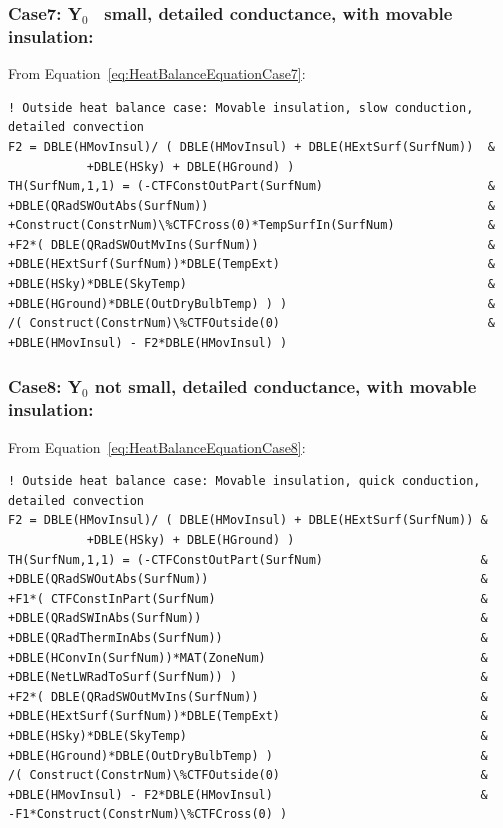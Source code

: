 \subsubsection{Case7: Y\(_{0}\)~ small, detailed conductance, with movable insulation:}\label{case7-yux5f0-small-detailed-conductance-with-movable-insulation-1}

From Equation~\ref{eq:HeatBalanceEquationCase7}:

\begin{lstlisting}
! Outside heat balance case: Movable insulation, slow conduction, detailed convection
F2 = DBLE(HMovInsul)/ ( DBLE(HMovInsul) + DBLE(HExtSurf(SurfNum))  &
           +DBLE(HSky) + DBLE(HGround) )
TH(SurfNum,1,1) = (-CTFConstOutPart(SurfNum)                       &
+DBLE(QRadSWOutAbs(SurfNum))                                       &
+Construct(ConstrNum)\%CTFCross(0)*TempSurfIn(SurfNum)             &
+F2*( DBLE(QRadSWOutMvIns(SurfNum))                                &
+DBLE(HExtSurf(SurfNum))*DBLE(TempExt)                             &
+DBLE(HSky)*DBLE(SkyTemp)                                          &
+DBLE(HGround)*DBLE(OutDryBulbTemp) ) )                            &
/( Construct(ConstrNum)\%CTFOutside(0)                             &
+DBLE(HMovInsul) - F2*DBLE(HMovInsul) )
\end{lstlisting}

\subsubsection{Case8: Y\(_{0}\) not small, detailed conductance, with movable insulation:}\label{case8-yux5f0-not-small-detailed-conductance-with-movable-insulation-1}

From Equation~\ref{eq:HeatBalanceEquationCase8}:

\begin{lstlisting}
! Outside heat balance case: Movable insulation, quick conduction, detailed convection
F2 = DBLE(HMovInsul)/ ( DBLE(HMovInsul) + DBLE(HExtSurf(SurfNum)) &
           +DBLE(HSky) + DBLE(HGround) )
TH(SurfNum,1,1) = (-CTFConstOutPart(SurfNum)                      &
+DBLE(QRadSWOutAbs(SurfNum))                                      &
+F1*( CTFConstInPart(SurfNum)                                     &
+DBLE(QRadSWInAbs(SurfNum))                                       &
+DBLE(QRadThermInAbs(SurfNum))                                    &
+DBLE(HConvIn(SurfNum))*MAT(ZoneNum)                              &
+DBLE(NetLWRadToSurf(SurfNum)) )                                  &
+F2*( DBLE(QRadSWOutMvIns(SurfNum))                               &
+DBLE(HExtSurf(SurfNum))*DBLE(TempExt)                            &
+DBLE(HSky)*DBLE(SkyTemp)                                         &
+DBLE(HGround)*DBLE(OutDryBulbTemp) )                             &
/( Construct(ConstrNum)\%CTFOutside(0)                            &
+DBLE(HMovInsul) - F2*DBLE(HMovInsul)                             &
-F1*Construct(ConstrNum)\%CTFCross(0) )
\end{lstlisting}

